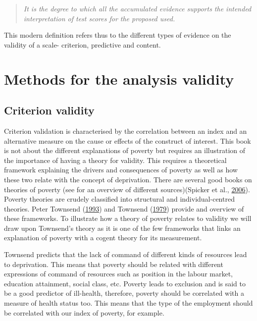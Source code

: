 \documentclass[]{book}
\begin{document}
\begin{quote}
\emph{It is the degree to which all the accumulated evidence supports the intended interpretation of test scores for the proposed used.}
\end{quote}

This modern definition refers thus to the different types of evidence on the validity of a scale- criterion, predictive and content.

\hypertarget{methods-for-the-analysis-validity}{%
\section{Methods for the analysis validity}\label{methods-for-the-analysis-validity}}

\hypertarget{criterion-validity}{%
\subsection{Criterion validity}\label{criterion-validity}}

Criterion validation is characterised by the correlation between an index and an alternative measure on the cause or effects of the construct of interest. This book is not about the different explanations of poverty but requires an illustration of the importance of having a theory for validity. This requires a theoretical framework explaining the drivers and consequences of poverty as well as how these two relate with the concept of deprivation. There are several good books on theories of poverty (see for an overview of different sources)(Spicker et al., \protect\hyperlink{ref-Spicker2006}{2006}). Poverty theories are crudely classified into structural and individual-centred theories. Peter Townsend (\protect\hyperlink{ref-Townsend1993}{1993}) and Townsend (\protect\hyperlink{ref-Townsend1979}{1979}) provide and overview of these frameworks. To illustrate how a theory of poverty relates to validity we will draw upon Townsend's theory as it is one of the few frameworks that links an explanation of poverty with a cogent theory for its measurement.

Townsend predicts that the lack of command of different kinds of resources lead to deprivation. This means that poverty should be related with different expressions of command of resources such as position in the labour market, education attainment, social class, etc. Poverty leads to exclusion and is said to be a good predictor of ill-health, therefore, poverty should be correlated with a measure of health status too. This means that the type of the employment should be correlated with our index of poverty, for example.
\end{document}
